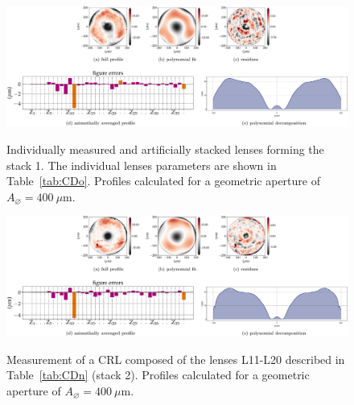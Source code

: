 \begin{refsection}
\begin{figure}[!htb]
    \centering
    {\includegraphics[width=1.\linewidth]{figures/ch04b/CDo_individual.pdf}}
    \caption[Artificially stacked lenses - stack 2 - figure errors]{Individually measured and artificially stacked lenses forming the stack 1. The individual lenses parameters are shown in Table~\ref{tab:CDo}. Profiles calculated for a geometric aperture of $A_{\diameter}=400~\mu\text{m}$.}
    \label{fig:accumulated_profile_2}
\end{figure}

\begin{figure}[!htb]
    \centering
    {\includegraphics[width=1.\linewidth]{figures/ch04b/CDo_Stack.pdf}}
    \caption[Stacked lenses - stack 2 - figure errors]{Measurement of a CRL composed of the lenses L11-L20 described in Table~\ref{tab:CDn} (stack 2). Profiles calculated for a geometric aperture of $A_{\diameter}=400~\mu\text{m}$.}
    \label{fig:CDo}
\end{figure}


\clearpage

\printbibliography[heading=subbibliography]
\end{refsection}


